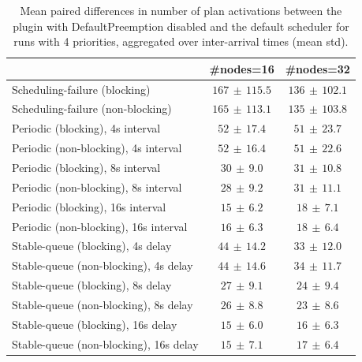 \begin{table}[t]
\tiny
\setlength{\tabcolsep}{1.2pt}
\renewcommand{\arraystretch}{1.12}
\centering
\caption{Mean paired differences in number of plan activations between the plugin with DefaultPreemption disabled and the default scheduler for runs with 4 priorities, aggregated over inter-arrival times (mean \pm std).}
\label{tab:plan_activations-defpreempt0-prio4-std1-agg-arrival}
\begin{tabular}{l c c}
\toprule
 & \#nodes=16 & \#nodes=32 \\
\midrule
Scheduling-failure (blocking) & $167\,\pm\,115.5$ & $136\,\pm\,102.1$ \\
Scheduling-failure (non-blocking) & $165\,\pm\,113.1$ & $135\,\pm\,103.8$ \\
Periodic (blocking), 4s interval & $52\,\pm\,17.4$ & $51\,\pm\,23.7$ \\
Periodic (non-blocking), 4s interval & $52\,\pm\,16.4$ & $51\,\pm\,22.6$ \\
Periodic (blocking), 8s interval & $30\,\pm\,9.0$ & $31\,\pm\,10.8$ \\
Periodic (non-blocking), 8s interval & $28\,\pm\,9.2$ & $31\,\pm\,11.1$ \\
Periodic (blocking), 16s interval & $15\,\pm\,6.2$ & $18\,\pm\,7.1$ \\
Periodic (non-blocking), 16s interval & $16\,\pm\,6.3$ & $18\,\pm\,6.4$ \\
Stable-queue (blocking), 4s delay & $44\,\pm\,14.2$ & $33\,\pm\,12.0$ \\
Stable-queue (non-blocking), 4s delay & $44\,\pm\,14.6$ & $34\,\pm\,11.7$ \\
Stable-queue (blocking), 8s delay & $27\,\pm\,9.1$ & $24\,\pm\,9.4$ \\
Stable-queue (non-blocking), 8s delay & $26\,\pm\,8.8$ & $23\,\pm\,8.6$ \\
Stable-queue (blocking), 16s delay & $15\,\pm\,6.0$ & $16\,\pm\,6.3$ \\
Stable-queue (non-blocking), 16s delay & $15\,\pm\,7.1$ & $17\,\pm\,6.4$ \\
\bottomrule
\end{tabular}
\end{table}
